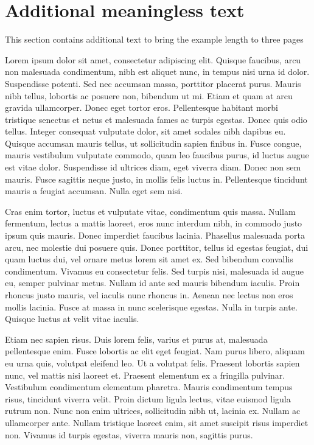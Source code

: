 \documentclass{modelica}
\begin{document}
\section{Additional meaningless text}
This section contains additional text to bring the example length to three pages



Lorem ipsum dolor sit amet, consectetur adipiscing elit. Quisque faucibus, arcu non malesuada condimentum, nibh est aliquet nunc, in tempus nisi urna id dolor. Suspendisse potenti. Sed nec accumsan massa, porttitor placerat purus. Mauris nibh tellus, lobortis ac posuere non, bibendum ut mi. Etiam et quam at arcu gravida ullamcorper. Donec eget tortor eros. Pellentesque habitant morbi tristique senectus et netus et malesuada fames ac turpis egestas. Donec quis odio tellus. Integer consequat vulputate dolor, sit amet sodales nibh dapibus eu. Quisque accumsan mauris tellus, ut sollicitudin sapien finibus in. Fusce congue, mauris vestibulum vulputate commodo, quam leo faucibus purus, id luctus augue est vitae dolor. Suspendisse id ultrices diam, eget viverra diam. Donec non sem mauris. Fusce sagittis neque justo, in mollis felis luctus in. Pellentesque tincidunt mauris a feugiat accumsan. Nulla eget sem nisi.

Cras enim tortor, luctus et vulputate vitae, condimentum quis massa. Nullam fermentum, lectus a mattis laoreet, eros nunc interdum nibh, in commodo justo ipsum quis mauris. Donec imperdiet faucibus lacinia. Phasellus malesuada porta arcu, nec molestie dui posuere quis. Donec porttitor, tellus id egestas feugiat, dui quam luctus dui, vel ornare metus lorem sit amet ex. Sed bibendum convallis condimentum. Vivamus eu consectetur felis. Sed turpis nisi, malesuada id augue eu, semper pulvinar metus. Nullam id ante sed mauris bibendum iaculis. Proin rhoncus justo mauris, vel iaculis nunc rhoncus in. Aenean nec lectus non eros mollis lacinia. Fusce at massa in nunc scelerisque egestas. Nulla in turpis ante. Quisque luctus at velit vitae iaculis.

Etiam nec sapien risus. Duis lorem felis, varius et purus at, malesuada pellentesque enim. Fusce lobortis ac elit eget feugiat. Nam purus libero, aliquam eu urna quis, volutpat eleifend leo. Ut a volutpat felis. Praesent lobortis sapien nunc, vel mattis nisi laoreet et. Praesent elementum ex a fringilla pulvinar. Vestibulum condimentum elementum pharetra. Mauris condimentum tempus risus, tincidunt viverra velit. Proin dictum ligula lectus, vitae euismod ligula rutrum non. Nunc non enim ultrices, sollicitudin nibh ut, lacinia ex. Nullam ac ullamcorper ante. Nullam tristique laoreet enim, sit amet suscipit risus imperdiet non. Vivamus id turpis egestas, viverra mauris non, sagittis purus.
\end{document}
